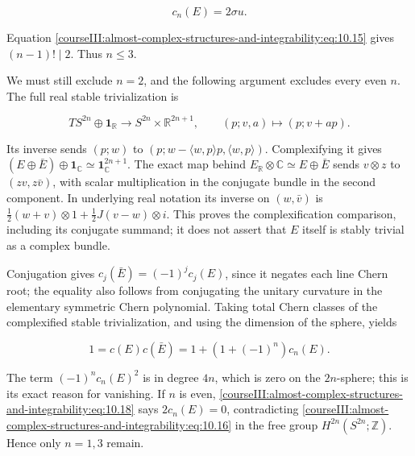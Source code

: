 \begin{equation}
c_n(E)=2\sigma u.
\label{courseIII:almost-complex-structures-and-integrability:eq:10.16}
\end{equation}

Equation \eqref{courseIII:almost-complex-structures-and-integrability:eq:10.15} gives \((n-1)!\mid2\). Thus \(n\leq3\).

We must still exclude \(n=2\), and the following argument excludes every even \(n\). The full real stable trivialization is

\begin{equation}
TS^{2n}\oplus\mathbf1_{\mathbb R}
\longrightarrow S^{2n}\times\mathbb R^{2n+1},
\qquad (p;v,a)\longmapsto(p;v+ap).
\label{courseIII:almost-complex-structures-and-integrability:eq:10.17}
\end{equation}

Its inverse sends \((p;w)\) to \((p;w-\langle w,p\rangle p,\langle w,p\rangle)\). Complexifying it gives
\((E\oplus\bar E)\oplus\mathbf1_{\mathbb C}\simeq\mathbf1_{\mathbb C}^{2n+1}\).
The exact map behind \(E_{\mathbb R}\otimes\mathbb C\simeq E\oplus\bar E\) sends \(v\otimes z\) to \((zv,z\bar v)\), with scalar multiplication in the conjugate bundle in the second component. In underlying real notation its inverse on \((w,\bar v)\) is
\(\frac12(w+v)\otimes1+\frac12J(v-w)\otimes i\).
This proves the complexification comparison, including its conjugate summand; it does not assert that \(E\) itself is stably trivial as a complex bundle.

Conjugation gives \(c_j(\bar E)=(-1)^jc_j(E)\), since it negates each line Chern root; the equality also follows from conjugating the unitary curvature in the elementary symmetric Chern polynomial. Taking total Chern classes of the complexified stable trivialization, and using the dimension of the sphere, yields

\begin{equation}
1=c(E)c(\bar E)
=1+(1+(-1)^n)c_n(E).
\label{courseIII:almost-complex-structures-and-integrability:eq:10.18}
\end{equation}

The term \((-1)^nc_n(E)^2\) is in degree \(4n\), which is zero on the \(2n\)-sphere; this is its exact reason for vanishing. If \(n\) is even, \eqref{courseIII:almost-complex-structures-and-integrability:eq:10.18} says \(2c_n(E)=0\), contradicting \eqref{courseIII:almost-complex-structures-and-integrability:eq:10.16} in the free group \(H^{2n}(S^{2n};\mathbb Z)\). Hence only \(n=1,3\) remain.

